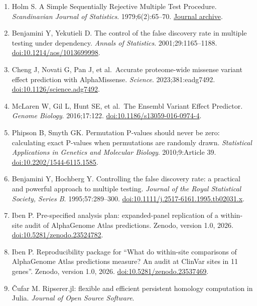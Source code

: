 \documentclass[
  11pt,
]{article}
\begin{document}
\begin{enumerate}
{  Acids Research}. 2025;53:D1313--D1321.
  \href{https://doi.org/10.1093/nar/gkae1090}{doi:10.1093/nar/gkae1090}.
\item
  Holm S. A Simple Sequentially Rejective Multiple Test Procedure.
  \emph{Scandinavian Journal of Statistics}. 1979;6(2):65--70.
  \href{https://www.jstor.org/stable/4615733}{Journal archive}.
\item
  Benjamini Y, Yekutieli D. The control of the false discovery rate in
  multiple testing under dependency. \emph{Annals of Statistics}.
  2001;29:1165--1188.
  \href{https://doi.org/10.1214/aos/1013699998}{doi:10.1214/aos/1013699998}.
\item
  Cheng J, Novati G, Pan J, et al.~Accurate proteome-wide missense
  variant effect prediction with AlphaMissense. \emph{Science}.
  2023;381:eadg7492.
  \href{https://doi.org/10.1126/science.adg7492}{doi:10.1126/science.adg7492}.
\item
  McLaren W, Gil L, Hunt SE, et al.~The Ensembl Variant Effect
  Predictor. \emph{Genome Biology}. 2016;17:122.
  \href{https://doi.org/10.1186/s13059-016-0974-4}{doi:10.1186/s13059-016-0974-4}.
\item
  Phipson B, Smyth GK. Permutation P-values should never be zero:
  calculating exact P-values when permutations are randomly drawn.
  \emph{Statistical Applications in Genetics and Molecular Biology}.
  2010;9:Article 39.
  \href{https://doi.org/10.2202/1544-6115.1585}{doi:10.2202/1544-6115.1585}.
\item
  Benjamini Y, Hochberg Y. Controlling the false discovery rate: a
  practical and powerful approach to multiple testing. \emph{Journal of
  the Royal Statistical Society, Series B}. 1995;57:289--300.
  \href{https://doi.org/10.1111/j.2517-6161.1995.tb02031.x}{doi:10.1111/j.2517-6161.1995.tb02031.x}.
\item
  Iben P. Pre-specified analysis plan: expanded-panel replication of a
  within-site audit of AlphaGenome Atlas predictions. Zenodo, version
  1.0, 2026.
  \href{https://doi.org/10.5281/zenodo.23524782}{doi:10.5281/zenodo.23524782}.
\item
  Iben P. Reproducibility package for ``What do within-site comparisons
  of AlphaGenome Atlas predictions measure? An audit at ClinVar sites in
  11 genes''. Zenodo, version 1.0, 2026.
  \href{https://doi.org/10.5281/zenodo.23537469}{doi:10.5281/zenodo.23537469}.
\item
  Čufar M. Ripserer.jl: flexible and efficient persistent homology
  computation in Julia. \emph{Journal of Open Source Software}.

\end{enumerate}
\end{document}
